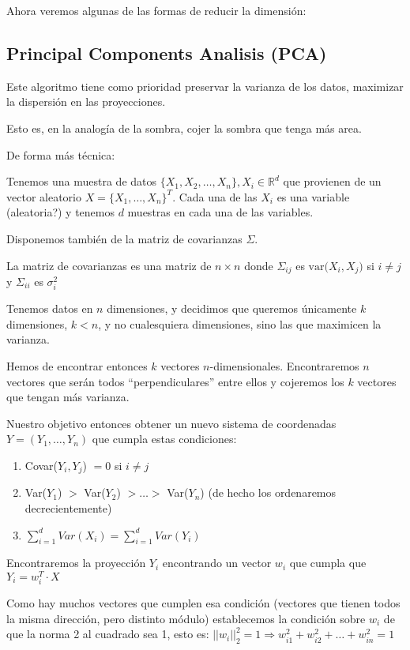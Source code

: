 \documentclass[a4paper,10pt]{article}
\begin{document}
Ahora veremos algunas de las formas de reducir la dimensión:
\subsection{Principal Components Analisis (PCA)}
Este algoritmo tiene como prioridad preservar la varianza de los datos, maximizar la dispersión en las proyecciones.

Esto es, en la analogía de la sombra, cojer la sombra que tenga más area.

De forma más técnica:

Tenemos una muestra de datos $\{X_1,X_2,\dots, X_n\}, X_i \in \mathbb{R}^d$ que provienen de un vector aleatorio $X = \{X_1,\dots,X_n\}^T$. Cada una de las $X_i$ es una variable (aleatoria?) y tenemos $d$ muestras en cada una de las variables.

Disponemos también de la matriz de covarianzas $\Sigma$.

La matriz de covarianzas es una matriz de $n \times n$ donde $\Sigma_{ij}$ es $\text{var(}X_i,X_j\text{)}$ si $i \neq j$ y $\Sigma_{ii}$ es $\sigma_i^2$

Tenemos datos en $n$ dimensiones, y decidimos que queremos únicamente $k$ dimensiones, $k < n$, y no cualesquiera dimensiones, sino las que maximicen la varianza.

Hemos de encontrar entonces $k$ vectores $n$-dimensionales. Encontraremos $n$ vectores que serán todos ``perpendiculares'' entre ellos y cojeremos los $k$ vectores que tengan más varianza.

Nuestro objetivo entonces obtener un nuevo sistema de coordenadas $Y = (Y_1,\dots,Y_n)$ que cumpla estas condiciones:
\begin{enumerate}
  \item Covar($Y_i,Y_j$) $ = 0$ si $i \neq j$
  \item Var($Y_1$) $>$ Var($Y_2$) $> \dots > $ Var($Y_n$) (de hecho los ordenaremos decrecientemente)
  \item $\sum_{i = 1}^{d} Var(X_i) = \sum_{i = 1}^{d} Var(Y_i)$
\end{enumerate}

Encontraremos la proyección $Y_i$ encontrando un vector $w_i$ que cumpla que $Y_i = w_i^T \cdot X$

Como hay muchos vectores que cumplen esa condición (vectores que tienen todos la misma dirección, pero distinto módulo) establecemos la condición sobre $w_i$ de que la norma 2 al cuadrado sea 1, esto es: $||w_i||_2^2 = 1 \Rightarrow w_{i1}^2 + w_{i2}^2 + \dots + w_{in}^2 = 1$
\end{document}
